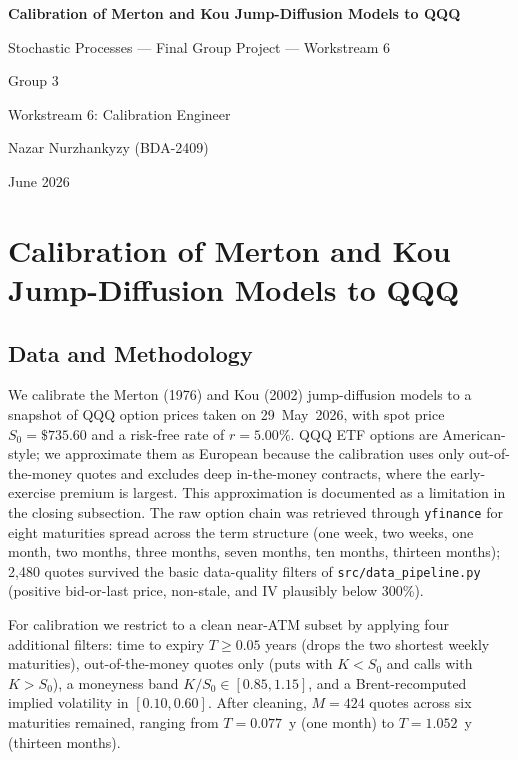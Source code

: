 \documentclass[11pt,a4paper]{article}
\begin{document}
\begin{titlepage}
    \centering
    \vspace*{3cm}
    {\Huge \textbf{Calibration of Merton and Kou Jump-Diffusion Models to QQQ} \par}
    \vspace{1.5cm}
    {\large Stochastic Processes --- Final Group Project --- Workstream 6 \par}
    \vspace{2cm}
    {\Large Group 3 \par}
    \vspace{0.6cm}
    {\large Workstream 6: Calibration Engineer \par}
    \vspace{0.4cm}
    {\large Nazar Nurzhankyzy (BDA-2409) \par}
    \vspace{2cm}
    {\large June 2026 \par}
    \vfill
\end{titlepage}

\section*{Calibration of Merton and Kou Jump-Diffusion Models to QQQ}

\subsection*{Data and Methodology}

We calibrate the Merton (1976) and Kou (2002) jump-diffusion models to a
snapshot of QQQ option prices taken on 29~May~2026, with spot price
$S_0 = \$735.60$ and a risk-free rate of $r = 5.00\%$. QQQ ETF options
are American-style; we approximate them as European because the
calibration uses only out-of-the-money quotes and excludes deep
in-the-money contracts, where the early-exercise premium is largest.
This approximation is documented as a limitation in the closing
subsection. The raw option chain was retrieved through
\texttt{yfinance} for eight maturities spread across the term structure
(one week, two weeks, one month, two months, three months, seven
months, ten months, thirteen months); 2{,}480 quotes survived the
basic data-quality filters of \texttt{src/data\_pipeline.py} (positive
bid-or-last price, non-stale, and IV plausibly below 300\%).

For calibration we restrict to a clean near-ATM subset by applying four
additional filters: time to expiry $T \geq 0.05$ years (drops the two
shortest weekly maturities), out-of-the-money quotes only (puts with
$K < S_0$ and calls with $K > S_0$), a moneyness band $K/S_0 \in
[0.85, 1.15]$, and a Brent-recomputed implied volatility in $[0.10,
0.60]$. After cleaning, $M = 424$ quotes across six maturities
remained, ranging from $T = 0.077$~y (one month) to $T = 1.052$~y
(thirteen months).
\end{document}
